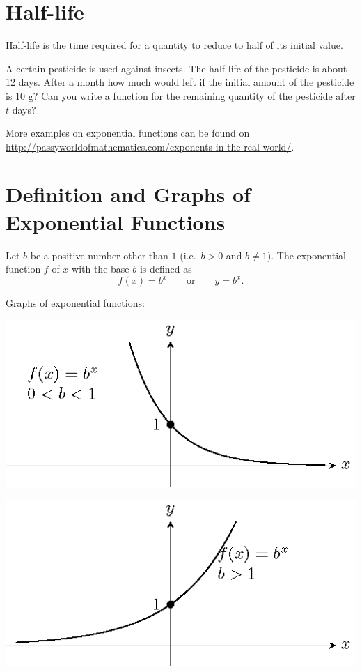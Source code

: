 \documentclass[
  en,11pt]{elegantbook}
\newcommand{\size}[2]{{\fontsize{#1}{0}\selectfont#2}}
\newenvironment{rmdthink}{
	\vspace*{0.5\baselineskip}
	\par\noindent
	\makebox[-4pt][r]{\color{green!90}\size{12}{\faLightbulbO}\,\,}
    \begin{tcolorbox}[
    enhanced,
    title={\textbf{\color{second}Think}},
    title style={left color=blue!10!green!20!white,right color=yellow!20!blue!20!white},
    colback=green!20!white,
    ]
    \sffamily
}{
    \end{tcolorbox}
	\par\ignorespacesafterend
}
\begin{document}
\hypertarget{half-life}{%
\section{Half-life}\label{half-life}}

\begin{rmdthink}

Half-life is the time required for a quantity to reduce to half of its initial value.

A certain pesticide is used against insects. The half life of the pesticide is about 12 days. After a month how much would left if the initial amount of the pesticide is 10 g? Can you write a function for the remaining quantity of the pesticide after \(t\) days?

\end{rmdthink}

More examples on exponential functions can be found on \url{http://passyworldofmathematics.com/exponents-in-the-real-world/}.

\hypertarget{definition-and-graphs-of-exponential-functions}{%
\section{Definition and Graphs of Exponential Functions}\label{definition-and-graphs-of-exponential-functions}}

Let \(b\) be a positive number other than \(1\) (i.e.~\(b>0\) and \(b\neq 1\)). The exponential function \(f\) of \(x\) with the base \(b\) is defined as
\[
f(x)=b^x\quad\quad\text{or}\quad\quad y=b^x.
\]

Graphs of exponential functions:

\begin{multicols}{2}

\begin{center}\includegraphics[width=0.5\linewidth]{figs/tikz-example-exp-function-1} \end{center}

\begin{center}\includegraphics[width=0.5\linewidth]{figs/tikz-example-exp-function-2} \end{center}

\end{multicols}
\end{document}
